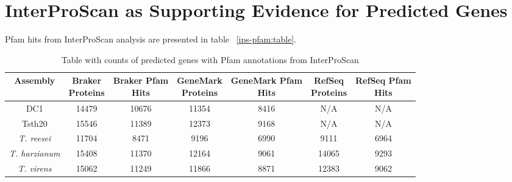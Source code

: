 \section{InterProScan as Supporting Evidence for Predicted Genes}

Pfam hits from InterProScan analysis are presented in table
~\ref{ips-pfam:table}.


\begin{table}
  \centering
  \begin{tabular}{|c|c|c|c|c|c|c|}
    \hline
    Assembly & \makecell{Braker \\ Proteins} & \makecell{Braker Pfam \\ Hits} & \makecell{GeneMark \\ Proteins} & \makecell{GeneMark Pfam \\Hits} & \makecell{RefSeq \\ Proteins} & \makecell{RefSeq Pfam \\ Hits}  \\ \hline
    DC1 & 14479 & 10676 & 11354 & 8416  & N/A & N/A \\ \hline
    Tsth20 & 15546 & 11389 & 12373 & 9168 & N/A & N/A \\ \hline
    \textit{T. reesei} & 11704 & 8471 & 9196 & 6990 & 9111 & 6964 \\ \hline
    \textit{T. harzianum} & 15408 & 11370 & 12164 & 9061 & 14065 & 9293 \\ \hline
    \textit{T. virens} & 15062 & 11249 & 11866 & 8871 & 12383 & 9062 \\ \hline
  \end{tabular}
  \caption[InterProScan Pfam Evidence]{Table with counts of predicted genes with Pfam annotations from InterProScan}
  \label{table:regioncounts}
\end{table}

